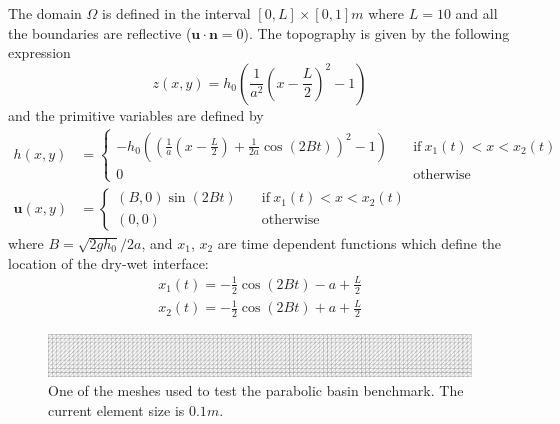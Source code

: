 \documentclass[a4paper,12pt]{article}
\begin{document}
The domain $\Omega$ is defined in the interval $[0,L]\times[0,1]m$ where $L=10$ and all the boundaries are reflective ($\mathbf{u}\cdot\mathbf{n} = 0$). The topography is given by the following expression
\begin{equation}
z(x,y) = h_0 \left(\frac{1}{a^2}\left(x - \frac{L}{2}\right)^2 - 1\right)
\end{equation}
and the primitive variables are defined by
\begin{subequations}
\begin{align}
h(x,y) &=
\begin{cases}
-h_0\left(\left(\frac{1}{a}\left(x - \frac{L}{2}\right) + \frac{1}{2a}\cos(2Bt)\right)^2 - 1\right)
\quad &\text{if} \ x_1(t) < x < x_2(t) \\
0 \quad &\text{otherwise}
\end{cases} \\
\mathbf{u}(x,y) &=
\begin{cases}
(B,0)\sin(2Bt) \quad &\text{if} \ x_1(t) < x < x_2(t) \\
(0,0) \quad &\text{otherwise}
\end{cases}
\end{align}
\end{subequations}
where $B=\sqrt{2gh_0}/2a$, and $x_1$, $x_2$ are time dependent functions which define the location of the dry-wet interface:
\begin{equation}
\begin{split}
x_1(t) = -\frac{1}{2}\cos(2Bt) - a + \frac{L}{2} \\
x_2(t) = -\frac{1}{2}\cos(2Bt) + a + \frac{L}{2}
\end{split}
\end{equation}

\begin{figure}
    \includegraphics[width=\textwidth]{img/par/mesh_0.1.pdf}
    \caption{One of the meshes used to test the parabolic basin benchmark. The current element size is $0.1m$.}
    \label{parabola_mesh}
\end{figure}
\end{document}
